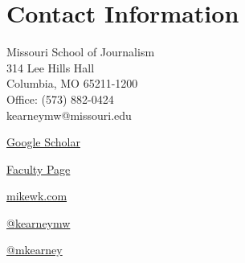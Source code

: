 
\section{Contact Information}
\parbox{3.5in}
{  \vspace{-.2in}
Missouri School of Journalism\\
  314 Lee Hills Hall\\
  Columbia, MO 65211-1200\\
  Office: (573) 882-0424\\
  kearneymw{@}missouri.edu}
\parbox{2.35in}
{  \vspace{-.2in}
\begin{flushright}
  \href{https://scholar.google.com/citations?user=j3EZl3MAAAAJ}{Google Scholar} \faGoogle

  \href{https://journalism.missouri.edu/staff/mike-kearney/}{Faculty Page} \faUniversity

  \href{http://mikewk.com/}{mikewk.com} \faHome

  \href{https://twitter.com/kearneymw}{{@}kearneymw} \faTwitter

  \href{https://github.com/mkearney/}{{@}mkearney} \faGithub
 \end{flushright}
}
